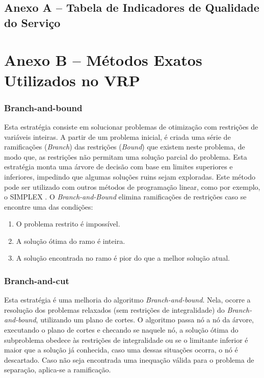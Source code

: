 \section*{Anexo A -- Tabela de Indicadores de Qualidade do Serviço}
\label{anexo-tabela-indicadores}


\chapter*{Anexo B -- Métodos Exatos Utilizados no VRP}
\label{anexo-metodos-exatos}
\subsection*{Branch-and-bound}
Esta estratégia consiste em solucionar problemas de otimização com restrições de variáveis inteiras. A partir de um problema inicial, é criada uma série de ramificações (\emph{Branch}) das restrições (\emph{Bound}) que existem neste problema, de modo que, as restrições não permitam uma solução parcial do problema. Esta estratégia monta uma árvore de decisão com base em limites superiores e inferiores, impedindo que algumas soluções ruins sejam exploradas. Este método pode ser utilizado com outros métodos de programação linear, como por exemplo, o SIMPLEX \cite{LAPORTE1992345}. O \emph{Branch-and-Bound} elimina ramificações de restrições caso se encontre uma das condições:

\begin{enumerate}
    \item O problema restrito é impossível.
    \item A solução ótima do ramo é inteira.
    \item A solução encontrada no ramo é pior do que a melhor solução atual.
\end{enumerate}

\subsection*{Branch-and-cut}
Esta estratégia é uma melhoria do algoritmo \emph{Branch-and-bound}. Nela, ocorre a resolução dos problemas relaxados (sem restrições de integralidade) do \emph{Branch-and-bound}, utilizando um plano de cortes. O algoritmo passa nó a nó da árvore, executando o plano de cortes e checando se naquele nó, a solução ótima do subproblema obedece às restrições de integralidade ou se o limitante inferior é maior que a solução já conhecida, caso uma dessas situações ocorra, o nó é descartado. Caso não seja encontrada uma inequação válida para o problema de separação, aplica-se a ramificação.


